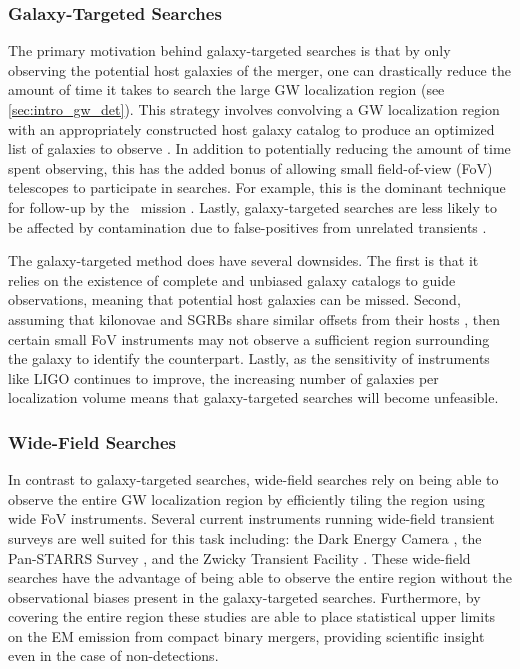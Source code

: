\subsubsection{Galaxy-Targeted Searches}
\label{sec:intro_galaxy}
The primary motivation behind galaxy-targeted searches is that by only observing the potential host galaxies of the merger, one can drastically reduce the amount of time it takes to search the large GW localization region (see \cref{sec:intro_gw_det}). This strategy involves convolving a GW localization region with an appropriately constructed host galaxy catalog \citep[e.g., the Gravitational Wave Galaxy Catalog, GWGV;][]{GWGCRef} to produce an optimized list of galaxies to observe \citep{Gehrels+16,Singer+16a,Singer+16b}. In addition to potentially reducing the amount of time spent observing, this has the added bonus of allowing small field-of-view (FoV) telescopes to participate in searches. For example, this is the dominant technique for follow-up by the \swift\ mission \citep{Gehrels+04,Kanner+12}. Lastly, galaxy-targeted searches are less likely to be affected by contamination due to false-positives from unrelated transients \citep{Singer+16a}.

The galaxy-targeted method does have several downsides. The first is that it relies on the existence of complete and unbiased galaxy catalogs to guide observations, meaning that potential host galaxies can be missed. Second, assuming that kilonovae and SGRBs share similar offsets from their hosts \citep[see e.g.,][]{FongBerger13}, then certain small FoV instruments may not observe a sufficient region surrounding the galaxy to identify the counterpart. Lastly, as the sensitivity of instruments like LIGO continues to improve, the increasing number of galaxies per localization volume means that galaxy-targeted searches will become unfeasible.

\subsubsection{Wide-Field Searches}
\label{sec:intro_widefield}
In contrast to galaxy-targeted searches, wide-field searches rely on being able to observe the entire GW localization region by efficiently tiling the region using wide FoV instruments. Several current instruments running wide-field transient surveys are well suited for this task including: the Dark Energy Camera \citep[DECam;][]{Flaugher+15}, the Pan-STARRS Survey \citep{Chambers+16}, and the Zwicky Transient Facility \citep[ZTF;][]{ZTFRef1,ZTFRef2}. These wide-field searches have the advantage of being able to observe the entire region without the observational biases present in the galaxy-targeted searches. Furthermore, by covering the entire region these studies are able to place statistical upper limits on the EM emission from compact binary mergers, providing scientific insight even in the case of non-detections.

